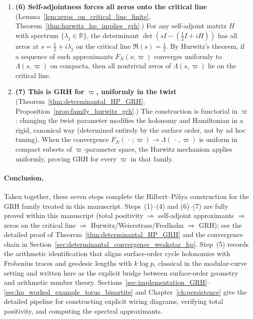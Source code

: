 \documentclass[11pt,oneside]{amsbook}
\numberwithin{equation}{section}
\theoremstyle{plain}
\theoremstyle{definition}
\theoremstyle{remark}
\begin{document}
\begin{enumerate}
\item
\textbf{(6) Self-adjointness forces all zeros onto the critical line}
(Lemma~\ref{lem:zeros_on_critical_line_finite}, Theorem~\ref{thm:hurwitz_hp_implies_grh}.)
For any self-adjoint matrix $H$ with spectrum $\{\lambda_j\in\mathbb{R}\}$, the determinant $\det(sI - (\tfrac{1}{2}I+iH))$ has all zeros at $s=\tfrac{1}{2}+i\lambda_j$ on the critical line $\Re(s)=\tfrac{1}{2}$.
By Hurwitz's theorem, if a sequence of such approximants $F_N(s;\varpi)$ converges uniformly to $\Lambda(s,\varpi)$ on compacta, then all nontrivial zeros of $\Lambda(s,\varpi)$ lie on the critical line.

\item
\textbf{(7) This is GRH for $\varpi$, uniformly in the twist}
(Theorem~\ref{thm:determinantal_HP_GRH}, Proposition~\ref{prop:family_hurwitz_grh}.)
The construction is functorial in $\varpi$: changing the twist parameter modifies the holonomy and Hamiltonian in a rigid, canonical way (determined entirely by the surface order, not by ad hoc tuning). When the convergence $F_N(\,\cdot\,;\varpi)\to\Lambda(\,\cdot\,,\varpi)$ is uniform in compact subsets of $\varpi$-parameter space, the Hurwitz mechanism applies uniformly, proving GRH for every $\varpi$ in that family.
\end{enumerate}

\paragraph{Conclusion.}
Taken together, these seven steps complete the Hilbert--Pólya construction for the GRH family treated in this manuscript.
Steps~(1)--(4) and (6)--(7) are fully proved within this manuscript (total positivity $\Rightarrow$ self-adjoint approximants $\Rightarrow$ zeros on the critical line $\Rightarrow$ Hurwitz/Weierstrass/Fredholm $\Rightarrow$ GRH); see the detailed proof of Theorem~\ref{thm:determinantal_HP_GRH} and the convergence chain in Section~\ref{sec:determinantal_convergence_weakstar_hp}.
Step~(5) records the arithmetic identification that aligns surface-order cycle holonomies with Frobenius traces and geodesic lengths with $k\log p$, classical in the modular-curve setting and written here as the explicit bridge between surface-order geometry and arithmetic number theory.
Sections~\ref{sec:implementation_GRH}--\ref{sec:hp_worked_example_torus_bipartite} and Chapter~\ref{ch:persistence} give the detailed pipeline for constructing explicit wiring diagrams, verifying total positivity, and computing the spectral approximants.
\end{document}
